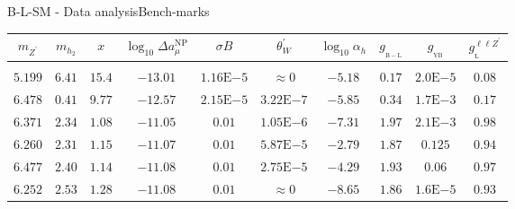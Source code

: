 \documentclass[10pt,xcolor=dvipsnames,mathserif]{beamer}
\newcommand{\g}[2]{g_{_\mathrm{#1}}^{#2}}
\newcommand{\red}[0]{\color{red}}
\newcommand{\cyan}[0]{\color{cyan}}
\begin{document}
\begin{frame}{B-L-SM - Data analysis}{Bench-marks}
    \setlength{\tabcolsep}{2pt} %
\renewcommand{\arraystretch}{1} %
%
\begin{table}[htb!]
\begin{center}
		\begin{tabular}{cccccccccc}
		\toprule
			$m_{Z^\prime}$ & $m_{h_2}$ &  $x$& $ \log_{10} \Delta a_\mu^{\mathrm{NP}}$ & $\sigma B$ & $\theta_W^\prime$ & $\log_{10}\alpha_h$ & $\g{B-L}{}$ & $\g{YB}{}$ & 
			$ \g{L}{\ell \ell Z^\prime} $%
			\vspace{1mm}
			\\
			\hline \vspace{-1mm} \\ 
{ \red $5.199$ }   & $6.41$     & $15.4$    & $-13.01$       & $1.16 \mathrm{E}{-5}$   & $\approx 0$                    & $-5.18$     & $0.17$   & $2.0\mathrm{E}{-5}$    & $0.08$  %
\vspace{1mm}  \\ 
 $6.478$    & { \cyan $0.41$ }    & $9.77$    & $-12.57$       & $2.15 \mathrm{E}{-5}$   & $3.22\mathrm{E}{-7}$      & $-5.85$     & $0.34$   & $1.7\mathrm{E}{-3}$    & $0.17$   %
\vspace{1mm}   \\ 
$6.371$    & $2.34$     & $1.08$   & $\mathbf{-11.05}$        & $0.01$                           & $1.05\mathrm{E}{-6}$      & $-7.31$     & $1.97$   & $2.1\mathrm{E}{-3}$    & $0.98$   %
\vspace{1mm}    \\ 
$6.260$    & $2.31$     & $1.15$   & $\mathbf{-11.07}$        & $0.01$                           & $5.87\mathrm{E}{-5}$      & $-2.79$     & $1.87$   & $0.125$                        & $0.94$  %
\vspace{1mm}   \\ 
$6.477$    & $2.40$      & $1.14$   & $\mathbf{-11.08}$       & $0.01$                           & $2.75\mathrm{E}{-5}$      & $-4.29$     & $1.93$   & $0.06$                          & $0.97$  %
\vspace{1mm}    \\ 
$6.252$    & $2.53$     & $1.28$   & $\mathbf{-11.08}$        & $0.01$                           & $\approx 0$                    & $-8.65$     & $1.86$   & $1.6\mathrm{E}{-5}$     & $0.93$   %

\end{tabular}
\end{center}
\end{table}
\end{frame}
\end{document}
